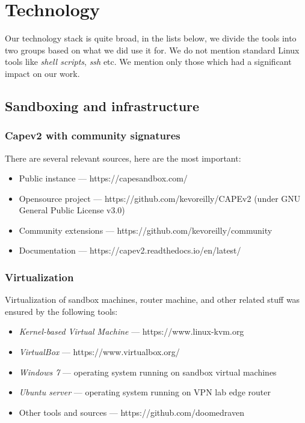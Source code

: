 \chapter{Technology} \label{app:technologies}
Our technology stack is quite broad, in the lists below, we divide the tools into two groups based on what we did use it for. We do not mention standard Linux tools like \emph{shell scripts}, \emph{ssh} etc. We mention only those which had a significant impact on our work.


\section*{Sandboxing and infrastructure}
\subsection*{Capev2 with community signatures}
There are several relevant sources, here are the most important:
\begin{itemize}
  \itemsep0em 
  \item Public instance --- https://capesandbox.com/
  \item Opensource project ---  https://github.com/kevoreilly/CAPEv2 (under GNU General Public License v3.0)
  \item Community extensions --- https://github.com/kevoreilly/community
  \item Documentation --- https://capev2.readthedocs.io/en/latest/
\end{itemize}

\subsection*{Virtualization}
Virtualization of sandbox machines, router machine, and other related stuff was ensured by the following tools:
\begin{itemize}
  \itemsep0em 
  \item \emph{Kernel-based Virtual Machine} --- https://www.linux-kvm.org
  \item \emph{VirtualBox} --- https://www.virtualbox.org/
  \item \emph{Windows 7} --- operating system running on sandbox virtual machines
  \item \emph{Ubuntu server} --- operating system running on VPN lab edge router
  \item Other tools and sources --- https://github.com/doomedraven
\end{itemize}


